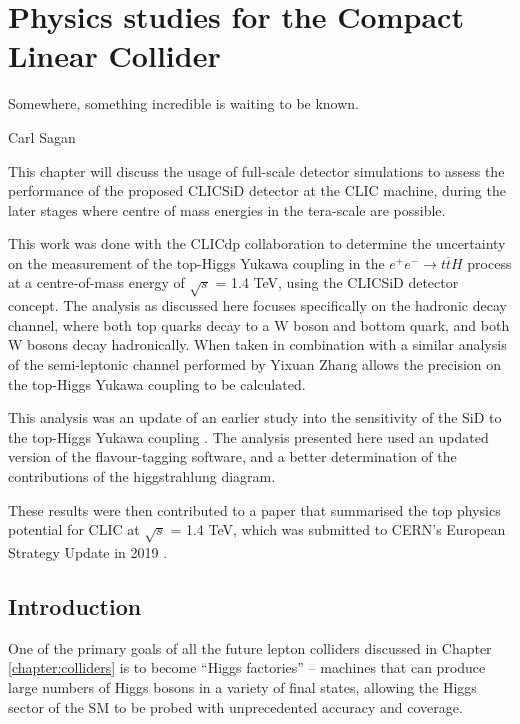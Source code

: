 
\chapter{Physics studies for the Compact Linear Collider}
\label{chapter:analysis}

\epigraph{Somewhere, something incredible is waiting to be known.}{Carl Sagan}

This chapter will discuss the usage of full-scale detector simulations to assess the performance of the proposed \acrshort{CLIC}\textunderscore \acrshort{SiD} detector at the \acrlong{CLIC} machine, during the later stages where centre of mass energies in the tera-scale are possible.

This work was done with the \acrfull{CLICdp} collaboration to determine the uncertainty on the measurement of the top-Higgs Yukawa coupling in the $e^+ e^- \rightarrow t\overline{t}H$ process at a centre-of-mass energy of $\sqrt{s}$ = 1.4 TeV, using the \acrshort{CLIC}\textunderscore \acrshort{SiD} detector concept. The analysis as discussed here focuses specifically on the hadronic decay channel, where both top quarks decay to a W boson and bottom quark, and both W bosons decay hadronically. When taken in combination with a similar analysis of the semi-leptonic channel performed by Yixuan Zhang allows the precision on the top-Higgs Yukawa coupling to be calculated.

This analysis was an update of an earlier study into the sensitivity of the \acrshort{SiD} to the top-Higgs Yukawa coupling \cite{clic-yukawa-coupling-2014}. The analysis presented here used an updated version of the flavour-tagging software, and a better determination of the contributions of the higgstrahlung diagram.

These results were then contributed to a paper that summarised the top physics potential for \acrshort{CLIC} at $\sqrt{s}$ = 1.4 TeV, which was submitted to \acrshort{CERN}'s European Strategy Update in 2019 \cite{clic-top-quark-physics} \cite{clic-2018-summary}.

\section{Introduction}
One of the primary goals of all the future lepton colliders discussed in Chapter \ref{chapter:colliders} is to become ``Higgs factories'' -- machines that can produce large numbers of Higgs bosons in a variety of final states, allowing the Higgs sector of the \acrlong{SM} to be probed with unprecedented accuracy and coverage.

